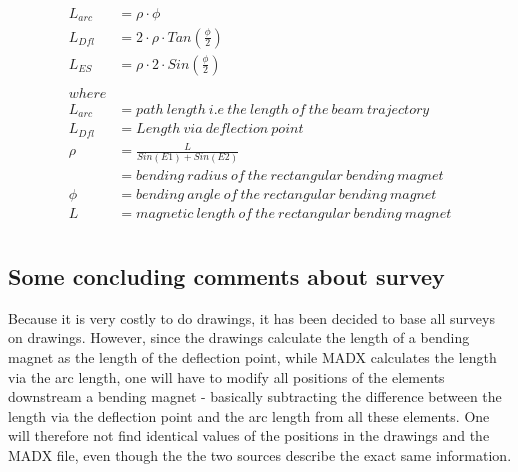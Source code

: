 \documentclass{cernatsnote}
\begin{document}
\begin{align*} 
\begin{split}
 L_{arc} & =\rho \cdot \phi \\
 L_{Dfl} & = 2\cdot \rho \cdot Tan(\frac{\phi}{2})   \\
  L_{ES} & = \rho \cdot 2 \cdot Sin(\frac{\phi}{2})  \\ \\
 where \\
 L_{arc} & = path\ length\ i.e\ the\ length\ of \ the \ beam\ trajectory \\
 L_{Dfl} & = Length\ via\ deflection\ point\ \\
 \rho & = \frac{L}{Sin(E1)+Sin(E2)} \\
  & = bending\ radius\ of\ the\ rectangular\ bending\ magnet \\
  \phi & = bending\ angle\ of\ the\ rectangular\ bending\ magnet \\
 L & = magnetic\  length\ of\ the\ rectangular\ bending\ magnet \\
\end{split}
\end{align*}

\subsection{Some concluding comments about survey}
Because it is very costly to do drawings, it has been decided to base all surveys on drawings. However, since the drawings calculate the length of a bending magnet as the length of the deflection point, while MADX calculates the length via the arc length, one will have to modify all positions of the elements downstream a bending magnet - basically subtracting the difference between the length via the deflection point and the arc length from all these elements. One will therefore not find identical values of the positions in the drawings and the MADX file, even though the the two sources describe the exact same information.



\end{document}
